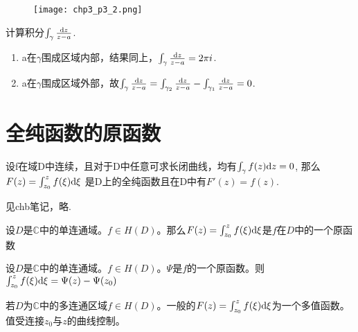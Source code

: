 \begin{figure}[h]
	\centering
	\texttt{[image: chp3\_p3\_2.png]}
\end{figure}

\begin{eg}
	计算积分$\int_\gamma \frac{\mathrm{d}z}{z - a}$.
\end{eg}
\begin{jie}
	\begin{enumerate}[(1)]
		\item a在$\gamma$围成区域内部，结果同上，$\int_\gamma \frac{\mathrm{d}z}{z-a} = 2\pi i$.
		\item a在$\gamma$围成区域外部，故$\int_\gamma \frac{\mathrm{d}z}{z-a} = \int_{\gamma_2} \frac{\mathrm{d}z}{z -a} - \int_{\gamma_1} \frac{\mathrm{d}z}{z-a} = 0$.
	\end{enumerate}
\end{jie}


\section{全纯函数的原函数}
\begin{mypro}
	设f在域D中连续，且对于D中任意可求长闭曲线，均有$\int_\gamma f(z) \mathrm{d}z = 0$, 那么$F(z) = \int_{z_0}^{z} f(\xi) \mathrm{d}\xi$ 是D上的全纯函数且在D中有$F'(z) = f(z)$.
\end{mypro}
\begin{mypro}
	见chb笔记，略.
\end{mypro}





\begin{mypro}
	设$D$是$\mathbb{C}$中的单连通域。$f\in H(D)$。那么$F(z)=\int_{z_0}^{z}f(\xi)\mathrm{d}\xi$是$f$在$D$中的一个原函数
\end{mypro}
\begin{mypro}
	设$D$是$\mathbb{C}$中的单连通域。$f\in H(D)$。$\Psi$是$f$的一个原函数。则$\int_{z_0}^{z}f(\xi)\mathrm{d}\xi=\Psi(z)-\Psi(z_0)$
\end{mypro}

若$D$为$\mathbb{C}$中的多连通区域$f\in H(D)$。一般的$F(z)=\int_{z_0}^{z}f(\xi)\mathrm{d}\xi$为一个多值函数。值受连接$z_0$与$z$的曲线控制。

